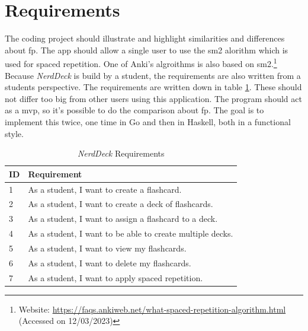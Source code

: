     \section{Requirements}
    The coding project should illustrate and highlight similarities and differences about \ac{fp}. The \ac{app} should allow a single user to use the \ac{sm2} alorithm which is used for spaced repetition.\cite{sm2} One of Anki's algroithms is also based on \ac{sm2}.\footnote{Website: \url{https://faqs.ankiweb.net/what-spaced-repetition-algorithm.html} (Accessed on 12/03/2023)} Because \textit{NerdDeck} is build by a student, the requirements are also written from a students perspective. The requirements are written down in table \ref{tab:requirements}. These should not differ too big from other users using this application. The program should act as a \ac{mvp}, so it's possible to do the comparison about \ac{fp}. The goal is to implement this twice, one time in Go and then in Haskell, both in a functional style.
    \begin{table}[h]
        \centering
        \begin{tabular}{|m{0.5in}|m{4in}|}
            \hline
            \textbf{ID} & \textbf{Requirement} \\
            \hline
            1 & As a student, I want to create a flashcard. \\
            \hline
            2 & As a student, I want to create a deck of flashcards. \\
            \hline
            3 & As a student, I want to assign a flashcard to a deck. \\
            \hline
            4 & As a student, I want to be able to create multiple decks. \\
            \hline
            5 & As a student, I want to view my flashcards. \\
            \hline
            6 & As a student, I want to delete my flashcards. \\
            \hline
            7 & As a student, I want to apply spaced repetition. \\
            \hline
        \end{tabular}
        \caption{\textit{NerdDeck} Requirements}
        \label{tab:requirements}
    \end{table}

